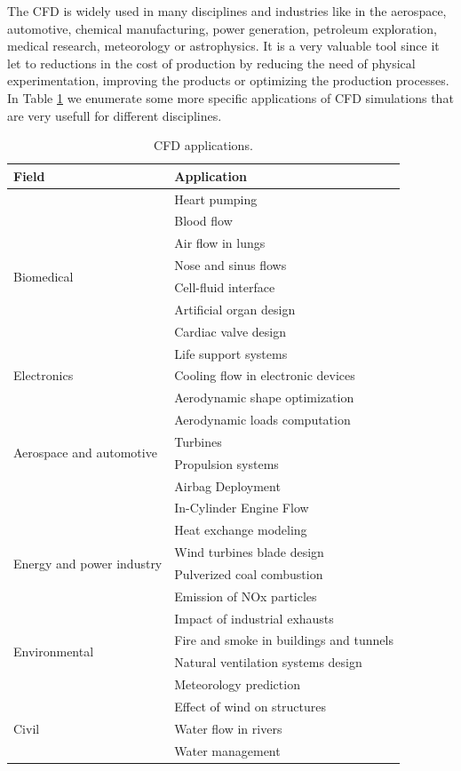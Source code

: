 The CFD is widely used in many disciplines and industries like in the aerospace, automotive, chemical manufacturing, power generation, petroleum exploration, medical research, meteorology or astrophysics. It is a very valuable tool since it let to reductions in the cost of production by reducing the need of physical experimentation, improving the products or optimizing the production processes. In Table \ref{table-CFD_applications} we enumerate some more specific applications of CFD simulations that are very usefull for different disciplines.
\begin{table}[h]
\centering
\begin{tabular}{ll}
\toprule
Field&Application\\
\midrule
\midrule
\multirow{8}{*}{Biomedical}&Heart pumping\\
&Blood flow\\
&Air flow in lungs\\
&Nose and sinus flows\\
&Cell-fluid interface\\
&Artificial organ design\\
&Cardiac valve design\\
&Life support systems\\
\midrule
\multirow{1}{*}{Electronics}&Cooling flow in electronic devices\\
\midrule
\multirow{6}{*}{Aerospace and automotive}&Aerodynamic shape optimization\\
&Aerodynamic loads computation\\
&Turbines\\
&Propulsion systems\\
&Airbag Deployment\\
&In-Cylinder Engine Flow\\
\midrule
\multirow{4}{*}{Energy and power industry}&Heat exchange modeling\\
&Wind turbines blade design\\
&Pulverized coal combustion\\
&Emission of NOx particles\\
\midrule
\multirow{4}{*}{Environmental}&Impact of industrial exhausts\\
&Fire and smoke in buildings and tunnels\\
&Natural ventilation systems design\\
&Meteorology prediction\\
\midrule
\multirow{4}{*}{Civil}&Effect of wind on structures\\
&Water flow in rivers\\
&Water management\\
\bottomrule
\end{tabular}
\caption{CFD applications.}
\label{table-CFD_applications}
\end{table}

